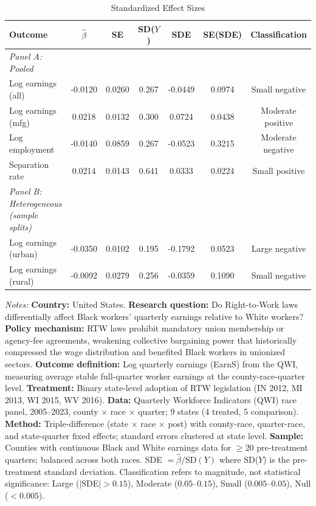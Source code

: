\begin{table}[htbp]
\centering
\caption{Standardized Effect Sizes}
\label{tab:sde}
\begin{threeparttable}
\scriptsize
\begin{tabular}{lcccccc}
\toprule
Outcome & $\hat{\beta}$ & SE & SD($Y$) & SDE & SE(SDE) & Classification \\
\midrule
\textit{Panel A: Pooled} & & & & & & \\
\quad Log earnings (all) & -0.0120 & 0.0260 & 0.267 & -0.0449 & 0.0974 & Small negative \\
\quad Log earnings (mfg) & 0.0218 & 0.0132 & 0.300 & 0.0724 & 0.0438 & Moderate positive \\
\quad Log employment & -0.0140 & 0.0859 & 0.267 & -0.0523 & 0.3215 & Moderate negative \\
\quad Separation rate & 0.0214 & 0.0143 & 0.641 & 0.0333 & 0.0224 & Small positive \\
\midrule
\textit{Panel B: Heterogeneous (sample splits)} & & & & & & \\
\quad Log earnings (urban) & -0.0350 & 0.0102 & 0.195 & -0.1792 & 0.0523 & Large negative \\
\quad Log earnings (rural) & -0.0092 & 0.0279 & 0.256 & -0.0359 & 0.1090 & Small negative \\
\bottomrule
\end{tabular}
\begin{tablenotes}[flushleft]\footnotesize\sloppy
\item \textit{Notes:} \textbf{Country:} United States. \textbf{Research question:} Do Right-to-Work laws differentially affect Black workers' quarterly earnings relative to White workers? \textbf{Policy mechanism:} RTW laws prohibit mandatory union membership or agency-fee agreements, weakening collective bargaining power that historically compressed the wage distribution and benefited Black workers in unionized sectors. \textbf{Outcome definition:} Log quarterly earnings (EarnS) from the QWI, measuring average stable full-quarter worker earnings at the county-race-quarter level. \textbf{Treatment:} Binary state-level adoption of RTW legislation (IN 2012, MI 2013, WI 2015, WV 2016). \textbf{Data:} Quarterly Workforce Indicators (QWI) race panel, 2005--2023, county $\times$ race $\times$ quarter; 9 states (4 treated, 5 comparison). \textbf{Method:} Triple-difference (state $\times$ race $\times$ post) with county-race, quarter-race, and state-quarter fixed effects; standard errors clustered at state level. \textbf{Sample:} Counties with continuous Black and White earnings data for $\geq$20 pre-treatment quarters; balanced across both races. SDE $= \hat{\beta} / \text{SD}(Y)$ where SD($Y$) is the pre-treatment standard deviation. Classification refers to magnitude, not statistical significance: Large ($|$SDE$| > 0.15$), Moderate ($0.05$--$0.15$), Small ($0.005$--$0.05$), Null ($< 0.005$).
\end{tablenotes}
\end{threeparttable}
\end{table}
